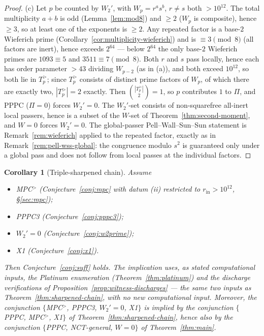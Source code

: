 \documentclass[11pt]{amsart}
\theoremstyle{plain}
\newtheorem{corollary}[theorem]{Corollary}
\theoremstyle{definition}
\theoremstyle{remark}
\numberwithin{equation}{section}
\begin{document}
\begin{proof}
(c) Let $p$ be counted by $W_2'$, with $W_p = r^a s^b$, $r \neq s$ both $> 10^{12}$. The total multiplicity $a + b$ is odd (Lemma~\ref{lem:mod8}) and $\geq 2$ ($W_p$ is composite), hence $\geq 3$, so at least one of the exponents is $\geq 2$. Any repeated factor is a base-$2$ Wieferich prime (Corollary~\ref{cor:multiplicity-wieferich}) and is $\equiv 3 \pmod 8$ (all factors are inert), hence exceeds $2^{64}$ --- below $2^{64}$ the only base-$2$ Wieferich primes are $1093 \equiv 5$ and $3511 \equiv 7 \pmod 8$. Both $r$ and $s$ pass locally, hence each has order parameter $> 43$ dividing $W_{p-2}$ (as in (a)), and both exceed $10^{12}$, so both lie in $T_p^{>}$; since $T_p^{>}$ consists of distinct prime factors of $W_p$, of which there are exactly two, $|T_p^{>}| = 2$ exactly. Then $\binom{|T_p^{>}|}{2} = 1$, so $p$ contributes $1$ to $\Pi$, and PPPC ($\Pi = 0$) forces $W_2' = 0$. The $W_2'$-set consists of non-squarefree all-inert local passers, hence is a subset of the $W$-set of Theorem~\ref{thm:second-moment}, and $W = 0$ forces $W_2' = 0$. The global-passer Pell--Wall--Sun--Sun statement is Remark~\ref{rem:wieferich} applied to the repeated factor, exactly as in Remark~\ref{rem:pell-wss-global}: the congruence modulo $s^2$ is guaranteed only under a global pass and does not follow from local passes at the individual factors.
\end{proof}

\begin{corollary}[Triple-sharpened chain]\label{cor:triple-chain}
Assume
\begin{itemize}
\item MPC$^{>}$ (Conjecture~\ref{conj:mpc} with datum (ii) restricted to $r_{\mathrm{in}} > 10^{12}$, \S\ref{sec:mpc});
\item PPPC3 (Conjecture~\ref{conj:pppc3});
\item $W_2' = 0$ (Conjecture~\ref{conj:w2prime});
\item X1 (Conjecture~\ref{conj:x1}).
\end{itemize}
Then Conjecture~\ref{conj:suff} holds. The implication uses, as stated computational inputs, the Platinum enumeration (Theorem~\ref{thm:platinum}) and the discharge verifications of Proposition~\ref{prop:witness-discharges} --- the same two inputs as Theorem~\ref{thm:sharpened-chain}, with no new computational input. Moreover, the conjunction $\{$MPC$^{>}$, PPPC3, $W_2' = 0$, X1$\}$ is implied by the conjunction $\{$PPPC, MPC$^{>}$, X1$\}$ of Theorem~\ref{thm:sharpened-chain}, hence also by the conjunction $\{$PPPC, NCT-general, $W = 0\}$ of Theorem~\ref{thm:main}.
\end{corollary}
\end{document}
